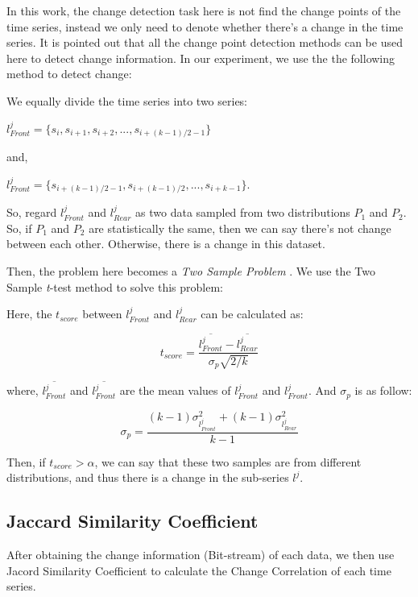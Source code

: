 In this work, the change detection task here is not find the change points of the time series, instead we only need to denote whether there's a change in the time series. It is pointed out that all the change point detection methods can be used here to detect change information.
In our experiment, we use the the following method to detect change:

We equally divide the time series into two series: 

$l^j_{Front} = \{s_i,s_{i+1},s_{i+2},...,s_{i+(k-1)/2 -1}\}$

and, 

$l^j_{Front} = \{s_{i+(k-1)/2 -1},s_{i+(k-1)/2},...,s_{i+k-1}\}$.

So, regard $l^j_{Front}$ and $l^j_{Rear}$ as two data sampled from two distributions $P_1$ and $P_2$. So, if $P_1$ and $P_2$ are statistically the same, then we can say there's not change between each other. Otherwise, there is a change in this dataset.

Then, the problem here becomes a \textit{Two Sample Problem} \cite{gretton2006kernel}. We use the Two Sample \textit{t}-test \cite{moore2007basic} method to solve this problem:

Here, the $t_{score}$ between $l^j_{Front}$ and $l^j_{Rear}$ can be calculated as:

\begin{equation}
t_{score} = \frac{\overline{l^j_{Front}} - \overline{l^j_{Rear}}}{\sigma_p\sqrt{2/k}}
\end{equation}

where, $\overline{l^j_{Front}}$ and $\overline{l^j_{Front}}$ are the mean values of $l^j_{Front}$ and $l^j_{Front}$. And $\sigma_p$ is as follow:

\begin{equation}
\sigma_p = \frac{(k-1)\sigma_{l^j_{Front}}^2 + (k-1)\sigma_{l^j_{Rear}}^2}{k-1}
\end{equation}

Then, if $t_{score} > \alpha$, we can say that these two samples are from different distributions, and thus there is a change in the sub-series $l^j$.

\subsection{Jaccard Similarity Coefficient}

After obtaining the change information (Bit-stream) of each data, we then use Jacord Similarity Coefficient to calculate the Change Correlation of each time series.

